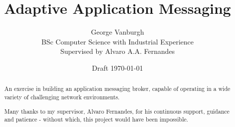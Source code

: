 \documentclass[a4paper,12pt,titlepage]{article}
\title{Adaptive Application Messaging}
\author{George Vanburgh\\
        BSc Computer Science with Industrial Experience\\
        Supervised by Alvaro A.A. Fernandes}
\date{Draft \today}
\begin{document}
  

  \maketitle

  \begin{abstract}
    An exercise in building an application messaging broker, capable of operating
    in a wide variety of challenging network environments.
  \end{abstract}

  \renewcommand{\abstractname}{Acknowledgements}
  \begin{abstract}
   Many thanks to my supervisor, Alvaro Fernandes, for his continuous support,
   guidance and patience - without which, this project would have been impossible.
  \end{abstract}

  \tableofcontents
  \begin{versionhistory}
  \end{versionhistory}
  \newpage

  

  

  

  \newpage

  \printglossaries

  \newpage


  \printbibliography
\end{document}

